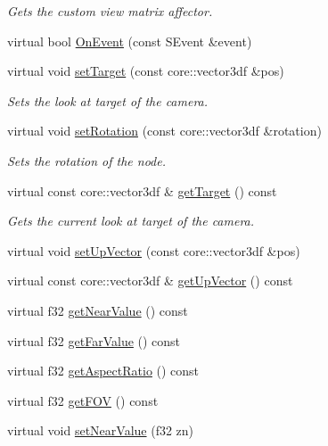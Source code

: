 \begin{DoxyCompactItemize}
\begin{DoxyCompactList}\small\item\em Gets the custom view matrix affector. \end{DoxyCompactList}\item 
virtual bool \hyperlink{classirr_1_1scene_1_1_c_camera_scene_node_a1234f5a92cce9cfd827d84e9a6939def}{On\-Event} (const S\-Event \&event)
\item 
virtual void \hyperlink{classirr_1_1scene_1_1_c_camera_scene_node_a57c8d7bd0721067ddbc6f728d882c5d8}{set\-Target} (const core\-::vector3df \&pos)
\begin{DoxyCompactList}\small\item\em Sets the look at target of the camera. \end{DoxyCompactList}\item 
virtual void \hyperlink{classirr_1_1scene_1_1_c_camera_scene_node_ab8e0cefadcd6fa48b58d91063c305f6b}{set\-Rotation} (const core\-::vector3df \&rotation)
\begin{DoxyCompactList}\small\item\em Sets the rotation of the node. \end{DoxyCompactList}\item 
virtual const core\-::vector3df \& \hyperlink{classirr_1_1scene_1_1_c_camera_scene_node_ad04b0d739c5d119b9c072d5e064010ef}{get\-Target} () const 
\begin{DoxyCompactList}\small\item\em Gets the current look at target of the camera. \end{DoxyCompactList}\item 
virtual void \hyperlink{classirr_1_1scene_1_1_c_camera_scene_node_a80f876d42938b059af26e5f9c99eeb0e}{set\-Up\-Vector} (const core\-::vector3df \&pos)
\item 
virtual const core\-::vector3df \& \hyperlink{classirr_1_1scene_1_1_c_camera_scene_node_a16c565caaad16d39f30d57e80df931ca}{get\-Up\-Vector} () const 
\item 
virtual f32 \hyperlink{classirr_1_1scene_1_1_c_camera_scene_node_a04817de1499d5c729979489e8945462a}{get\-Near\-Value} () const 
\item 
virtual f32 \hyperlink{classirr_1_1scene_1_1_c_camera_scene_node_a9572cc1de9706535ad5ce7b42dba6bce}{get\-Far\-Value} () const 
\item 
virtual f32 \hyperlink{classirr_1_1scene_1_1_c_camera_scene_node_a0096263987b854296fb3b05fb803cfda}{get\-Aspect\-Ratio} () const 
\item 
virtual f32 \hyperlink{classirr_1_1scene_1_1_c_camera_scene_node_a952a8c5bb41313256b5210b45f7d29c8}{get\-F\-O\-V} () const 
\item 
\hypertarget{classirr_1_1scene_1_1_c_camera_scene_node_aebef61b52ca7bc3d047d065858b499e9}{virtual void \hyperlink{classirr_1_1scene_1_1_c_camera_scene_node_aebef61b52ca7bc3d047d065858b499e9}{set\-Near\-Value} (f32 zn)}\label{classirr_1_1scene_1_1_c_camera_scene_node_aebef61b52ca7bc3d047d065858b499e9}


\end{DoxyCompactItemize}
